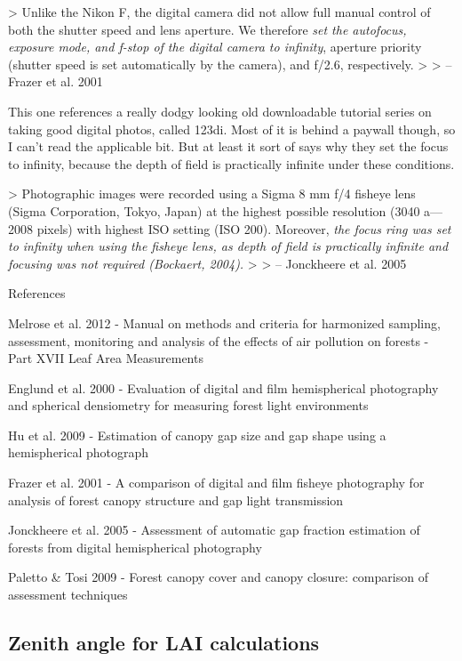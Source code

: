 \documentclass{article}
\begin{document}
> Unlike the Nikon F, the digital camera did not allow full manual control of both the shutter speed and lens aperture. We therefore \textit{set the autofocus, exposure mode, and f-stop of the digital camera to infinity}, aperture priority (shutter speed is set automatically by the camera), and f/2.6, respectively. 
> 
> -- Frazer et al. 2001

This one references a really dodgy looking old downloadable tutorial series on taking good digital photos, called 123di. Most of it is behind a paywall though, so I can't read the applicable bit. But at least it sort of says why they set the focus to infinity, because the depth of field is practically infinite under these conditions.

> Photographic images were recorded using a Sigma 8 mm f/4 fisheye lens (Sigma Corporation, Tokyo, Japan) at the highest possible resolution (3040 a— 2008 pixels) with highest ISO setting (ISO 200). Moreover, \textit{the focus ring was set to infinity when using the fisheye lens, as depth of field is practically infinite and focusing was not required (Bockaert, 2004).}
>
> -- Jonckheere et al. 2005


References

Melrose et al. 2012 - Manual on methods and criteria for harmonized sampling, assessment, monitoring and analysis of the effects of air pollution on forests - Part XVII Leaf Area Measurements

Englund et al. 2000 - Evaluation of digital and film hemispherical photography and spherical densiometry for measuring forest light environments

Hu et al. 2009 - Estimation of canopy gap size and gap shape using a hemispherical photograph

Frazer et al. 2001 - A comparison of digital and film fisheye photography for analysis of forest canopy structure and gap light transmission

Jonckheere et al. 2005 - Assessment of automatic gap fraction estimation of forests from digital hemispherical photography 

Paletto \& Tosi 2009 - Forest canopy cover and canopy closure: comparison of assessment techniques





\subsection{Zenith angle for LAI calculations}
\end{document}
